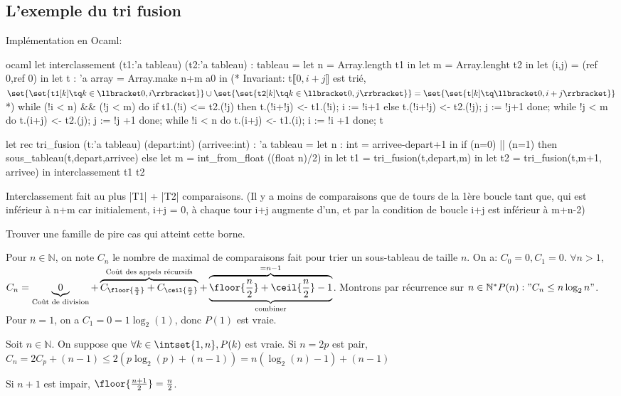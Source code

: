 \documentclass{scrartcl}
\begin{document}
		\subsection{L'exemple du tri fusion}
			Implémentation en Ocaml:
			\begin{code}{ocaml}
				let interclassement (t1:'a tableau) (t2:'a tableau) : tableau =
					let n = Array.length t1 in
					let m = Array.lenght t2 in
					let (i,j) = (ref 0,ref 0) in
					let t : 'a array = Array.make n+m a0 in
					(* Invariant: t$\llbracket 0,i+j \rrbracket$ est trié, $\set{\set{\mathtt{t1}[k] \tq k \in \llbracket 0,i \rrbracket}} \cup \set{\set{\mathtt{t2}[k] \tq k \in \llbracket 0,j \rrbracket }} = \set{\set{\mathtt{t}[k] \tq \llbracket 0, i+j \rrbracket}}$*)
					while (!i < n) && (!j < m) do
						if t1.(!i) <= t2.(!j) then
							t.(!i+!j) <- t1.(!i);
							i := !i+1
						else
							t.(!i+!j) <- t2.(!j);
							j := !j+1
					done; 
					while !j < m do
						t.(i+j) <- t2.(j);
						j := !j +1
					done;
					while !i < n do
						t.(i+j) <- t1.(i);
						i := !i +1
					done; t

				let rec tri_fusion (t:'a tableau) (depart:int) (arrivee:int) : 'a tableau =
					let n : int = arrivee-depart+1 in
					if (n=0) || (n=1) then sous_tableau(t,depart,arrivee)
					else 
						let m = int_from_float ((float n)/2) in
						let t1 = tri_fusion(t,depart,m) in
						let t2 = tri_fusion(t,m+1, arrivee) in
						interclassement t1 t2
			\end{code}

			Interclassement fait au plus |T1| + |T2| comparaisons. (Il y a moins de comparaisons que de tours de la 1ère boucle tant que, 
			qui est inférieur à n+m car initialement, i+j = 0, à chaque tour i+j augmente d'un, et par la condition de boucle i+j est inférieur à m+n-2)

			\exo Trouver une famille de pire cas qui atteint cette borne. 

			Pour $n \in \mathbb{N}$, on note $C_n$ le nombre de maximal de comparaisons
			fait pour trier un sous-tableau de taille $n$. On a:
			$C_0 = 0, C_1=0$.
			$\forall n > 1$, $C_n = \underbrace{0}_\text{Coût de division} + \overbrace{C_{\floor{\frac{n}{2}}} + C_{\ceil{\frac{n}{2}}}}^\text{Coût des appels récursifs} 
			+ \underbrace{\overbrace{\floor{\frac{n}{2}} + \ceil{\frac{n}{2}} - 1}^{=n-1}}_\text{combiner}$.
			Montrons par récurrence sur $n \in \mathbb{N}^* P(n): "C_n \leq n\log_2{n}"$. 
			Pour $n=1$, on a $C_1 = 0 = 1\log_2(1)$, donc $P(1)$ est vraie.
			
			Soit $n \in \mathbb{N}$. On suppose que $\forall k \in \intset{1,n}, P(k)$ est vraie. Si $n = 2p$ est pair, 
			$C_n = 2C_p + (n-1) \leq 2(p\log_2(p) + (n-1)) = n(\log_2(n)-1) + (n-1)$  

			Si $n+1$ est impair, $\floor{\frac{n+1}{2}} = \frac{n}{2}$.
\end{document}
